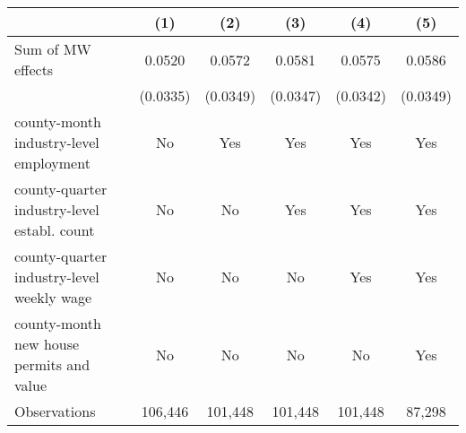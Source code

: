 {
\def\sym#1{\ifmmode^{#1}\else\(^{#1}\)\fi}
\begin{tabular}{l*{5}{c}}
\hline\hline
          &\multicolumn{1}{c}{(1)}         &\multicolumn{1}{c}{(2)}         &\multicolumn{1}{c}{(3)}         &\multicolumn{1}{c}{(4)}         &\multicolumn{1}{c}{(5)}         \\
\hline
Sum of MW effects&   0.0520         &   0.0572         &   0.0581         &   0.0575         &   0.0586         \\
          & (0.0335)         & (0.0349)         & (0.0347)         & (0.0342)         & (0.0349)         \\
\hline
county-month industry-level employment&       No         &      Yes         &      Yes         &      Yes         &      Yes         \\
county-quarter industry-level establ. count&       No         &       No         &      Yes         &      Yes         &      Yes         \\
county-quarter industry-level weekly wage&       No         &       No         &       No         &      Yes         &      Yes         \\
county-month new house permits and value&       No         &       No         &       No         &       No         &      Yes         \\
Observations&  106,446         &  101,448         &  101,448         &  101,448         &   87,298         \\
\hline\hline
\end{tabular}
}
